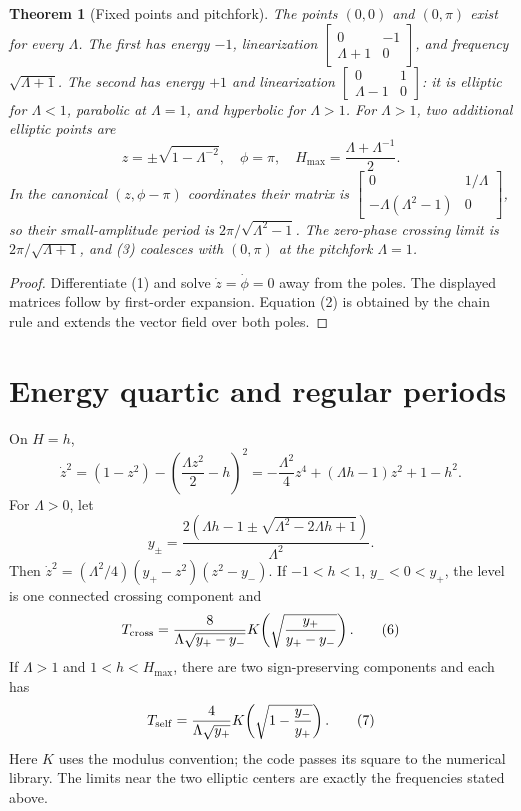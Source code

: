 \documentclass[10pt]{article}
\newtheorem{theorem}{Theorem}
\begin{document}
\begin{theorem}[Fixed points and pitchfork]
The points \((0,0)\) and \((0,\pi)\) exist for every \(\Lambda\).  The first
has energy \(-1\), linearization
\(\left[\begin{smallmatrix}0&-1\\\Lambda+1&0\end{smallmatrix}\right]\),
and frequency \(\sqrt{\Lambda+1}\).  The second has energy \(+1\) and
linearization \(\left[\begin{smallmatrix}0&1\\\Lambda-1&0\end{smallmatrix}\right]\):
it is elliptic for \(\Lambda<1\), parabolic at \(\Lambda=1\), and hyperbolic
for \(\Lambda>1\).  For \(\Lambda>1\), two additional elliptic points are
\[
 z=\pm\sqrt{1-\Lambda^{-2}},\quad \phi=\pi,\quad
 H_{\max}=\frac{\Lambda+\Lambda^{-1}}2. \tag{3}
\]
In the canonical \((z,\phi-\pi)\) coordinates their matrix is
\(\left[\begin{smallmatrix}0&1/\Lambda\\-\Lambda(\Lambda^2-1)&0\end{smallmatrix}\right]\),
so their small-amplitude period is
\(2\pi/\sqrt{\Lambda^2-1}\).  The zero-phase crossing limit is
\(2\pi/\sqrt{\Lambda+1}\), and (3) coalesces with \((0,\pi)\) at the
pitchfork \(\Lambda=1\).
\end{theorem}
\begin{proof}
Differentiate (1) and solve \(\dot z=\dot\phi=0\) away from the poles.
The displayed matrices follow by first-order expansion.  Equation (2) is
obtained by the chain rule and extends the vector field over both poles.
\end{proof}

\section{Energy quartic and regular periods}
On \(H=h\),
\[
 \dot z^2=(1-z^2)-\left(\frac{\Lambda z^2}{2}-h\right)^2
 =-\frac{\Lambda^2}{4}z^4+(\Lambda h-1)z^2+1-h^2. \tag{4}
\]
For \(\Lambda>0\), let
\[
 y_\pm=\frac{2(\Lambda h-1\pm
 \sqrt{\Lambda^2-2\Lambda h+1})}{\Lambda^2}. \tag{5}
\]
Then \(\dot z^2=(\Lambda^2/4)(y_+-z^2)(z^2-y_-)\).  If
\(-1<h<1\), \(y_-<0<y_+\), the level is one connected crossing component and
\[
 T_{\rm cross}=\frac{8}{\Lambda\sqrt{y_+-y_-}}
 K\!\left(\sqrt{\frac{y_+}{y_+-y_-}}\right). \tag{6}
\]
If \(\Lambda>1\) and \(1<h<H_{\max}\), there are two sign-preserving
components and each has
\[
 T_{\rm self}=\frac{4}{\Lambda\sqrt{y_+}}
 K\!\left(\sqrt{1-\frac{y_-}{y_+}}\right). \tag{7}
\]
Here \(K\) uses the modulus convention; the code passes its square to the
numerical library.  The limits near the two elliptic centers are exactly the
frequencies stated above.
\end{document}

